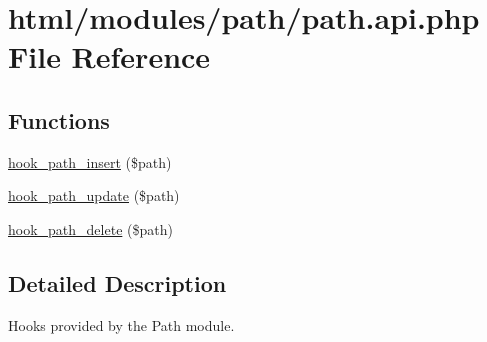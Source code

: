 \hypertarget{path_8api_8php}{
\section{html/modules/path/path.api.php File Reference}
\label{path_8api_8php}
}
\subsection*{Functions}
\begin{DoxyCompactItemize}
\item 
\hyperlink{group__hooks_gaa0decf43e13f49d88850786b00290d97}{hook\_\-path\_\-insert} (\$path)
\item 
\hyperlink{group__hooks_ga317c17e152ebb4fc477bb8bfe9294960}{hook\_\-path\_\-update} (\$path)
\item 
\hyperlink{group__hooks_ga1d7d28de5542f0a6364604ae0b122b7f}{hook\_\-path\_\-delete} (\$path)
\end{DoxyCompactItemize}


\subsection{Detailed Description}
Hooks provided by the Path module. 